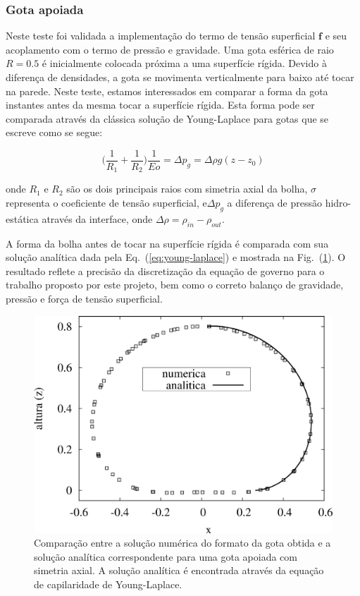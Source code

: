 \documentclass[a4paper,portuges,12pt]{article}
\newcommand{\fvet}{\mathbf{f}}
\begin{document}
\subsubsection{Gota apoiada}

Neste teste foi validada a implementação do termo de tensão superficial
$\fvet$ e seu acoplamento com o termo de pressão e gravidade. Uma gota
esférica de raio $R=0.5$ é inicialmente colocada próxima a uma
superfície rígida. Devido à diferença de densidades, a gota se movimenta
verticalmente para baixo até tocar na parede. Neste teste, estamos
interessados em comparar a forma da gota instantes antes da mesma tocar
a superfície rígida. Esta forma pode ser comparada através da
clássica solução de Young-Laplace para gotas que se escreve como se
segue:

\begin{equation}
	\big( \frac{1}{R_1}+\frac{1}{R_2} \big)\frac{1}{Eo}
	=
	\Delta p_g
	=
	\Delta \rho g (z-z_0)
	\label{eq:young-laplace}
\end{equation}

\noindent onde $R_1$ e $R_2$ são os dois principais raios com simetria
axial da bolha, $\sigma$ representa o coeficiente de tensão superficial,
e$\Delta p_g$ a diferença de pressão hidro-estática através da
interface, onde $\Delta \rho = \rho_{in}-\rho_{out}$. 

A forma da bolha antes de tocar na superfície rígida é comparada com sua
solução analítica dada pela Eq.~(\ref{eq:young-laplace}) e mostrada na 
Fig.~(\ref{fig:sessileShape}). O resultado reflete a precisão da
discretização da equação de governo para o trabalho proposto por este
projeto, bem como o correto balanço de gravidade, pressão e força de
tensão superficial.

 \begin{figure}[h!]
 	\begin{center}
 		\includegraphics[angle=0, scale=0.5]{figs/sessileShape.pdf}
 	\end{center}
	\caption{Comparação entre a solução numérica do formato da gota
	obtida e a solução
	analítica correspondente para uma gota apoiada com simetria axial.
	A solução analítica é encontrada através da equação de capilaridade
	de Young-Laplace.}
 	\label{fig:sessileShape} 
 \end{figure}
\end{document}
